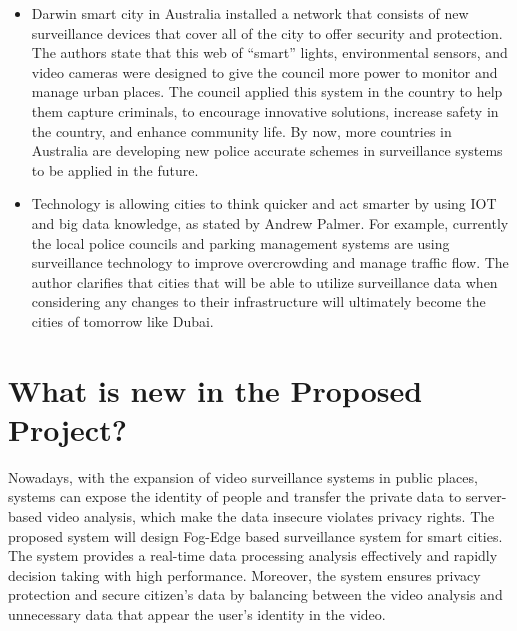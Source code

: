 \documentclass[12pt]{article}
\begin{document}
\begin{itemize}
\item Darwin smart city in Australia \cite{theconversation.com} installed a network that consists of new surveillance devices that cover all of the city to offer security and protection. The authors state that this web of “smart” lights, environmental sensors, and video cameras were designed to give the council more power to monitor and manage urban places. The council applied this system in the country to help them capture criminals, to encourage innovative solutions, increase safety in the country, and enhance community life. By now,  more countries in Australia are developing new police accurate schemes in surveillance systems to be applied in the future.

\item Technology is allowing cities to think quicker and act smarter \cite{sourcesecurity.com} by using  IOT and big data knowledge, as stated by Andrew Palmer.
For example, currently the local police councils and parking management systems are using surveillance technology to improve overcrowding and manage traffic flow. The author clarifies that cities that will be able to utilize surveillance data when considering any changes to their infrastructure will ultimately become the cities of tomorrow like Dubai.

\end{itemize}

\newpage
\section{What is new in the Proposed Project?}
Nowadays, with the expansion of video surveillance systems in public places, systems can expose the identity of people and transfer the private data to server-based video analysis, which make the data insecure  violates privacy rights. The proposed system will design Fog-Edge based surveillance system for smart cities. The system provides a real-time data processing analysis effectively and rapidly decision taking with high performance. Moreover, the system ensures privacy protection and secure citizen's data by balancing between the video analysis and unnecessary data that appear the user's identity in the video.
\end{document}
